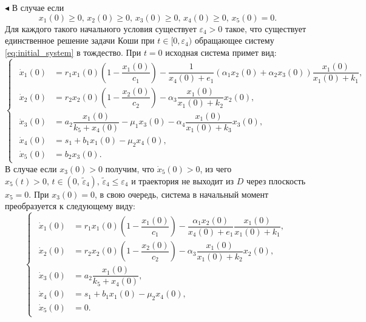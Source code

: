 \documentclass[12pt,a4paper]{extarticle}
\renewenvironment{proof}{\noindent$\blacktriangleleft$}{}
\theoremstyle{definition}
\theoremstyle{definition}
\theoremstyle{definition}
\begin{document}
\begin{proof}
		В случае если 
		\begin{equation}\label{eq:conds_4}
			x_1(0)\ge0,\, x_2(0)\ge0,\, x_3(0)\ge0,\, x_4(0)\ge0,\, x_5(0)=0.
		\end{equation}
		Для каждого такого начального условия существует $\varepsilon_4>0$ такое, что существует единственное решение задачи Коши при $t\in[0,\varepsilon_4)$ обращающее систему \ref{eq:initial_system} в тождество. При $t=0$ исходная система примет вид:
		\begin{equation*}
			\begin{cases}
				\begin{aligned}
					\dot{x}_1(0) &= r_1x_1(0)\left(1-\dfrac{x_1(0)}{c_1}\right)-\dfrac{1}{x_4(0)+e_1}(\alpha_1x_2(0)+\alpha_2x_3(0))\dfrac{x_1(0)}{x_1(0)+k_1},\\
					\dot{x}_2(0) &= r_2x_2(0)\left(1-\dfrac{x_2(0)}{c_2}\right)-\alpha_3\dfrac{x_1(0)}{x_1(0)+k_2}x_2(0),\\
					\dot{x}_3(0) &= a_2\dfrac{x_1(0)}{k_5+x_4(0)}-\mu_1x_3(0)-\alpha_4\dfrac{x_1(0)}{x_1(0)+k_3}x_3(0),\\
					\dot{x}_4(0) &= s_1 + b_1x_1(0)-\mu_2x_4(0),\\
					\dot{x}_5(0) &= b_2x_3(0).
				\end{aligned}
			\end{cases}
		\end{equation*}
		В случае если $x_3(0)>0$ получим, что $\dot{x}_5(0)>0$, из чего $x_5(t)>0,\, t\in(0,\, \tilde{\varepsilon}_4),\,\tilde{\varepsilon}_4\le\varepsilon_4$ и траектория не выходит из $D$ через плоскость $x_5=0$. При $x_3(0)=0$, в свою очередь, система в начальный момент преобразуется к следующему виду:
		\begin{equation*}
			\begin{cases}
				\begin{aligned}
					\dot{x}_1(0) &= r_1x_1(0)\left(1-\dfrac{x_1(0)}{c_1}\right)-\dfrac{\alpha_1x_2(0)}{x_4(0)+e_1}\dfrac{x_1(0)}{x_1(0)+k_1},\\
					\dot{x}_2(0) &= r_2x_2(0)\left(1-\dfrac{x_2(0)}{c_2}\right)-\alpha_3\dfrac{x_1(0)}{x_1(0)+k_2}x_2(0),\\
					\dot{x}_3(0) &= a_2\dfrac{x_1(0)}{k_5+x_4(0)},\\
					\dot{x}_4(0) &= s_1 + b_1x_1(0)-\mu_2x_4(0),\\
					\dot{x}_5(0) &= 0.
				\end{aligned}
			\end{cases}
		\end{equation*} 

\end{proof}
\end{document}
